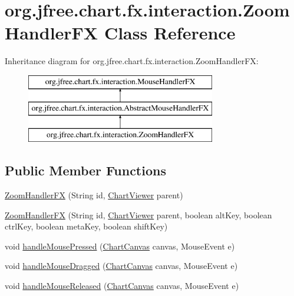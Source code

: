 \hypertarget{classorg_1_1jfree_1_1chart_1_1fx_1_1interaction_1_1_zoom_handler_f_x}{}\section{org.\+jfree.\+chart.\+fx.\+interaction.\+Zoom\+Handler\+FX Class Reference}
\label{classorg_1_1jfree_1_1chart_1_1fx_1_1interaction_1_1_zoom_handler_f_x}
Inheritance diagram for org.\+jfree.\+chart.\+fx.\+interaction.\+Zoom\+Handler\+FX\+:\begin{figure}[H]
\begin{center}
\leavevmode
\includegraphics[height=3.000000cm]{classorg_1_1jfree_1_1chart_1_1fx_1_1interaction_1_1_zoom_handler_f_x}
\end{center}
\end{figure}
\subsection*{Public Member Functions}
\begin{DoxyCompactItemize}
\item 
\mbox{\hyperlink{classorg_1_1jfree_1_1chart_1_1fx_1_1interaction_1_1_zoom_handler_f_x_a87838fdea9f29dab0589c0c892a7d000}{Zoom\+Handler\+FX}} (String id, \mbox{\hyperlink{classorg_1_1jfree_1_1chart_1_1fx_1_1_chart_viewer}{Chart\+Viewer}} parent)
\item 
\mbox{\hyperlink{classorg_1_1jfree_1_1chart_1_1fx_1_1interaction_1_1_zoom_handler_f_x_a44112479fac9eaa8bfa9f2a98cdcc7f9}{Zoom\+Handler\+FX}} (String id, \mbox{\hyperlink{classorg_1_1jfree_1_1chart_1_1fx_1_1_chart_viewer}{Chart\+Viewer}} parent, boolean alt\+Key, boolean ctrl\+Key, boolean meta\+Key, boolean shift\+Key)
\item 
void \mbox{\hyperlink{classorg_1_1jfree_1_1chart_1_1fx_1_1interaction_1_1_zoom_handler_f_x_a39eb9924bd9125f685df78a26fe8317d}{handle\+Mouse\+Pressed}} (\mbox{\hyperlink{classorg_1_1jfree_1_1chart_1_1fx_1_1_chart_canvas}{Chart\+Canvas}} canvas, Mouse\+Event e)
\item 
void \mbox{\hyperlink{classorg_1_1jfree_1_1chart_1_1fx_1_1interaction_1_1_zoom_handler_f_x_a42e60db6b183e94f2997e79647bb5403}{handle\+Mouse\+Dragged}} (\mbox{\hyperlink{classorg_1_1jfree_1_1chart_1_1fx_1_1_chart_canvas}{Chart\+Canvas}} canvas, Mouse\+Event e)
\item 
void \mbox{\hyperlink{classorg_1_1jfree_1_1chart_1_1fx_1_1interaction_1_1_zoom_handler_f_x_af47ee1c3f51772d2bbd503c5d6c3ba71}{handle\+Mouse\+Released}} (\mbox{\hyperlink{classorg_1_1jfree_1_1chart_1_1fx_1_1_chart_canvas}{Chart\+Canvas}} canvas, Mouse\+Event e)
\end{DoxyCompactItemize}



